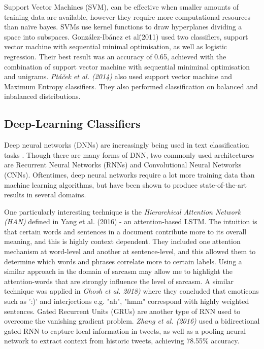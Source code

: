 \documentclass[12pt,a4paper]{article}
\begin{document}
Support Vector Machines (SVM), can be effective when smaller amounts of training data are available, however they require more computational resources than na\"{i}ve bayes. SVMs use kernel functions to draw hyperplanes dividing a space into subspaces. Gonz{\'a}lez-Ib{\'a}nez et al\. (2011) \cite{gonzalez2011identifying} used two classifiers, support vector machine with sequential minimal optimisation, as well as logistic regression. Their best result was an accuracy of 0.65, achieved with the combination of support vector machine with sequential miniminal optimisation and unigrams. \textit{Pt{\'a}{\v{c}ek et al. (2014)}} \cite{ptavcek2014sarcasm} also used support vector machine and Maximum Entropy classifiers. They also performed classification on balanced and inbalanced distributions.

\subsection{Deep-Learning Classifiers}
Deep neural networks (DNNs) are increasingly being used in text classification tasks \cite{zhang2015character, poria2016deeper}. Though there are many forms of DNN, two commonly used architectures are Recurrent Neural Networks (RNNs) and Convolutional Neural Networks (CNNs). Oftentimes, deep neural networks require a lot more training data than machine learning algorithms, but have been shown to produce state-of-the-art results in several domains.




One particularly interesting technique is the \textit{Hierarchical Attention Network (HAN)} defined in Yang et al. (2016) \cite{yang2016hierarchical} - an attention-based LSTM. The intuition is that certain words and sentences in a document contribute more to its overall meaning, and this is highly context dependent. They included one attention mechanism at word-level and another at sentence-level, and this allowed them to determine which words and phrases correlate more to certain labels. Using a similar approach in the domain of sarcasm may allow me to highlight the attention-words that are strongly influence the level of sarcasm. A similar technique was applied in \textit{Ghosh et al. 2018)} \cite{ghosh2018sarcasm} where they concluded that emoticons such as ':)' and interjections e.g. "ah", "hmm" correspond with highly weighted sentences. Gated Recurrent Units (GRUs) are another type of RNN used to overcome the vanishing gradient problem.  \textit{Zhang et al. (2016)} \cite{zhang2016tweet} used a bidirectional gated RNN to capture local information in tweets, as well as a pooling neural network to extract context from historic tweets, achieving 78.55\% accuracy.
\end{document}
